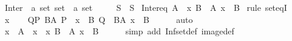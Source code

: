 \begin{isabellebody}
\endisatagproof
{\isafoldproof}%
%
\isadelimproof
\isanewline
%
\endisadelimproof
\isanewline
{}\isamarkupfalse%
%
\isadelimdocument
%
\endisadelimdocument
%
\isatagdocument
%
\isamarkuptrue%
%
\endisatagdocument
{\isafolddocument}%
%
\isadelimdocument
%
\endisadelimdocument
{}\isamarkupfalse%
\ Inter\ {\isacharcolon}{\kern0pt}{\isacharcolon}{\kern0pt}\ {\isachardoublequoteopen}{\isacharprime}{\kern0pt}a\ set\ set\ {\isasymRightarrow}\ {\isacharprime}{\kern0pt}a\ set{\isachardoublequoteclose}\ \ {\isacharparenleft}{\kern0pt}{\isachardoublequoteopen}{\isasymInter}{\isachardoublequoteclose}{\isacharparenright}{\kern0pt}\isanewline
\ \ \ {\isachardoublequoteopen}{\isasymInter}S\ {\isasymequiv}\ {\isasymSqinter}S{\isachardoublequoteclose}\isanewline
\isanewline
{}\isamarkupfalse%
\ Inter{\isacharunderscore}{\kern0pt}eq{\isacharcolon}{\kern0pt}\ {\isachardoublequoteopen}{\isasymInter}A\ {\isacharequal}{\kern0pt}\ {\isacharbraceleft}{\kern0pt}x{\isachardot}{\kern0pt}\ {\isasymforall}B\ {\isasymin}\ A{\isachardot}{\kern0pt}\ x\ {\isasymin}\ B{\isacharbraceright}{\kern0pt}{\isachardoublequoteclose}\isanewline
%
\isadelimproof
%
\endisadelimproof
%
\isatagproof
{}\isamarkupfalse%
\ {\isacharparenleft}{\kern0pt}rule\ set{\isacharunderscore}{\kern0pt}eqI{\isacharparenright}{\kern0pt}\isanewline
\ \ \isamarkupfalse%
\ x\isanewline
\ \ \isamarkupfalse%
\ {\isachardoublequoteopen}{\isacharparenleft}{\kern0pt}{\isasymforall}Q{\isasymin}{\isacharbraceleft}{\kern0pt}P{\isachardot}{\kern0pt}\ {\isasymexists}B{\isasymin}A{\isachardot}{\kern0pt}\ P\ {\isasymlongleftrightarrow}\ x\ {\isasymin}\ B{\isacharbraceright}{\kern0pt}{\isachardot}{\kern0pt}\ Q{\isacharparenright}{\kern0pt}\ {\isasymlongleftrightarrow}\ {\isacharparenleft}{\kern0pt}{\isasymforall}B{\isasymin}A{\isachardot}{\kern0pt}\ x\ {\isasymin}\ B{\isacharparenright}{\kern0pt}{\isachardoublequoteclose}\isanewline
\ \ \ \ \isamarkupfalse%
\ auto\isanewline
\ \ \isamarkupfalse%
\ \isamarkupfalse%
\ {\isachardoublequoteopen}x\ {\isasymin}\ {\isasymInter}A\ {\isasymlongleftrightarrow}\ x\ {\isasymin}\ {\isacharbraceleft}{\kern0pt}x{\isachardot}{\kern0pt}\ {\isasymforall}B\ {\isasymin}\ A{\isachardot}{\kern0pt}\ x\ {\isasymin}\ B{\isacharbraceright}{\kern0pt}{\isachardoublequoteclose}\isanewline
\ \ \ \ \isamarkupfalse%
\ {\isacharparenleft}{\kern0pt}simp\ add{\isacharcolon}{\kern0pt}\ Inf{\isacharunderscore}{\kern0pt}set{\isacharunderscore}{\kern0pt}def\ image{\isacharunderscore}{\kern0pt}def{\isacharparenright}{\kern0pt}\isanewline

\end{isabellebody}
